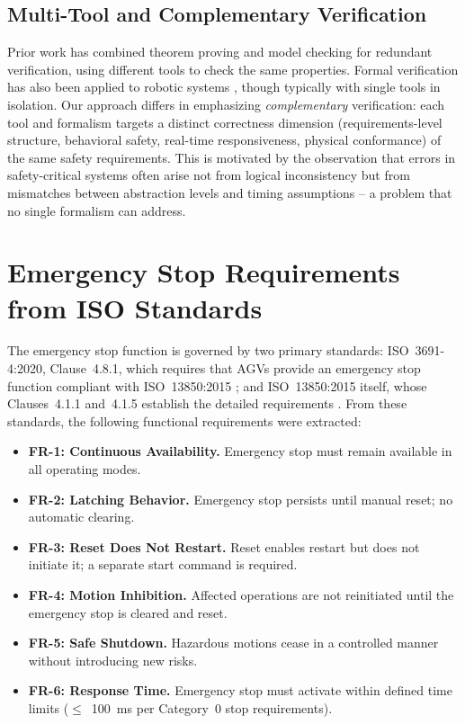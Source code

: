 \documentclass{ieeeaccess}
\theoremstyle{definition}
\begin{document}
\subsection{Multi-Tool and Complementary Verification}
Prior work has combined theorem proving and model checking \cite{Bjorner1996} for redundant verification, using different tools to check the same properties. Formal verification has also been applied to robotic systems \cite{Webster2021}, though typically with single tools in isolation. Our approach differs in emphasizing \emph{complementary} verification: each tool and formalism targets a distinct correctness dimension (requirements-level structure, behavioral safety, real-time responsiveness, physical conformance) of the same safety requirements. This is motivated by the observation that errors in safety-critical systems often arise not from logical inconsistency but from mismatches between abstraction levels and timing assumptions -- a problem that no single formalism can address.

\section{Emergency Stop Requirements from ISO Standards}
\label{sec:estop_iso}

The emergency stop function is governed by two primary standards: ISO~3691-4:2020, Clause~4.8.1, which requires that AGVs provide an emergency stop function compliant with ISO~13850:2015 \cite{ISO3691-4}; and ISO~13850:2015 itself, whose Clauses~4.1.1 and~4.1.5 establish the detailed requirements \cite{ISO13850}. From these standards, the following functional requirements were extracted:

\begin{itemize}
\item \textbf{FR-1: Continuous Availability.} Emergency stop must remain available in all operating modes.
\item \textbf{FR-2: Latching Behavior.} Emergency stop persists until manual reset; no automatic clearing.
\item \textbf{FR-3: Reset Does Not Restart.} Reset enables restart but does not initiate it; a separate start command is required.
\item \textbf{FR-4: Motion Inhibition.} Affected operations are not reinitiated until the emergency stop is cleared and reset.
\item \textbf{FR-5: Safe Shutdown.} Hazardous motions cease in a controlled manner without introducing new risks.
\item \textbf{FR-6: Response Time.} Emergency stop must activate within defined time limits ($\leq$~100~ms per Category~0 stop requirements).
\end{itemize}
\end{document}
